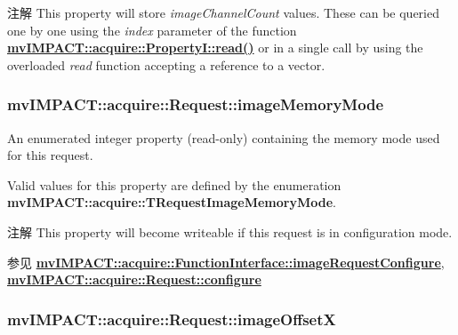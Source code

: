 \begin{DoxyNote}{注解}
This property will store {\itshape image\+Channel\+Count} values. These can be queried one by one using the {\itshape index} parameter of the function {\bfseries \hyperlink{classmv_i_m_p_a_c_t_1_1acquire_1_1_enum_property_i_a6f88e97f646978391226aaf82cd5955d}{mv\+I\+M\+P\+A\+C\+T\+::acquire\+::\+Property\+I\+::read()}} or in a single call by using the overloaded {\itshape read} function accepting a reference to a vector. 
\end{DoxyNote}
\hypertarget{classmv_i_m_p_a_c_t_1_1acquire_1_1_request_a05c7f2aad294449e1a9f6eb4a13597d4}{
\subsubsection[{image\+Memory\+Mode}]{ mv\+I\+M\+P\+A\+C\+T\+::acquire\+::\+Request\+::image\+Memory\+Mode}}\label{classmv_i_m_p_a_c_t_1_1acquire_1_1_request_a05c7f2aad294449e1a9f6eb4a13597d4}


An enumerated integer property {\bfseries }(read-\/only) containing the memory mode used for this request. 

Valid values for this property are defined by the enumeration {\bfseries mv\+I\+M\+P\+A\+C\+T\+::acquire\+::\+T\+Request\+Image\+Memory\+Mode}.

\begin{DoxyNote}{注解}
This property will become writeable if this request is in configuration mode. 
\end{DoxyNote}
\begin{DoxySeeAlso}{参见}
{\bfseries \hyperlink{classmv_i_m_p_a_c_t_1_1acquire_1_1_function_interface_a05594ac5b54679152d27ac0e73b3908e}{mv\+I\+M\+P\+A\+C\+T\+::acquire\+::\+Function\+Interface\+::image\+Request\+Configure}}, ~\newline
{\bfseries \hyperlink{classmv_i_m_p_a_c_t_1_1acquire_1_1_request_a5ad02aed16acd60699f3d8757c63af43}{mv\+I\+M\+P\+A\+C\+T\+::acquire\+::\+Request\+::configure}} 
\end{DoxySeeAlso}
\hypertarget{classmv_i_m_p_a_c_t_1_1acquire_1_1_request_a1d51bca84206dbed070f85751dbdbb92}{
\subsubsection[{image\+Offset\+X}]{ mv\+I\+M\+P\+A\+C\+T\+::acquire\+::\+Request\+::image\+Offset\+X}}\label{classmv_i_m_p_a_c_t_1_1acquire_1_1_request_a1d51bca84206dbed070f85751dbdbb92}



